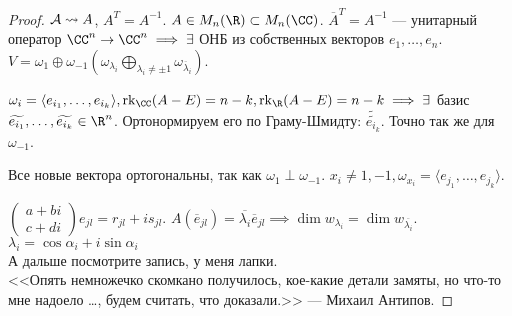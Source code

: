 \begin{proof}
    $\mathcal{A} \leadsto A$,  $A^T = A^{-1}$.  $A \in M_n(\R) \subset M_n(\CC)$.  $\overline{A}^T = A^{-1}$ --- унитарный оператор $\CC^n \to \CC^n \implies \exists$ ОНБ из собственных векторов  $e_1, \ldots, e_n$. $V = \omega_1 \oplus \omega_{-1} (\omega_{\lambda_i} \bigoplus\limits_{\lambda_i \neq \pm 1} \omega_{\overline{\lambda}_i})$.

    $\omega_i = \langle e_{i_1}, \ldots, e_{i_k} \rangle, \rk_\CC (A - E) = n - k, \rk_\R (A-E) = n - k \implies \exists$ базис $\widetilde{e_{i_1}}, \ldots, \widetilde{e_{i_k}} \in \R^n$. Ортонормируем его по Граму-Шмидту: $\widetilde{\widetilde{e_{i_k}}}$. Точно так же для  $\omega_{-1}$.

    Все новые вектора ортогональны, так как  $\omega_{1} \perp \omega_{-1}$.  $x_i \neq 1, -1, \omega_{x_i} = \langle e_{j_1}, \ldots , e_{j_k} \rangle$.

    $\begin{pmatrix} a + bi \\ c + di \end{pmatrix} e_{jl} = r_{jl} + is_{jl}$. $A(\overline{e}_{jl}) = \overline{\lambda_i} \overline{e}_{jl} \implies \dim w_{\lambda_i} = \dim w_{\overline{\lambda_i}}$.\\
$\lambda_i = \cos \alpha_i + i\sin \alpha_i$\\
А дальше посмотрите запись, у меня лапки.\\
<<Опять немножечко скомкано получилось, кое-какие детали замяты, но что-то мне надоело \ldots, будем считать, что доказали.>> — Михаил Антипов.
\end{proof}
